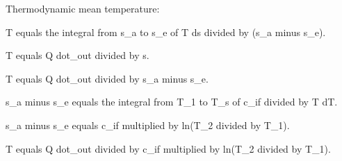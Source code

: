Thermodynamic mean temperature:  

T equals the integral from s_a to s_e of T ds divided by (s_a minus s_e).  

T equals Q dot_out divided by s.  

T equals Q dot_out divided by s_a minus s_e.  

s_a minus s_e equals the integral from T_1 to T_s of c_if divided by T dT.  

s_a minus s_e equals c_if multiplied by ln(T_2 divided by T_1).  

T equals Q dot_out divided by c_if multiplied by ln(T_2 divided by T_1).